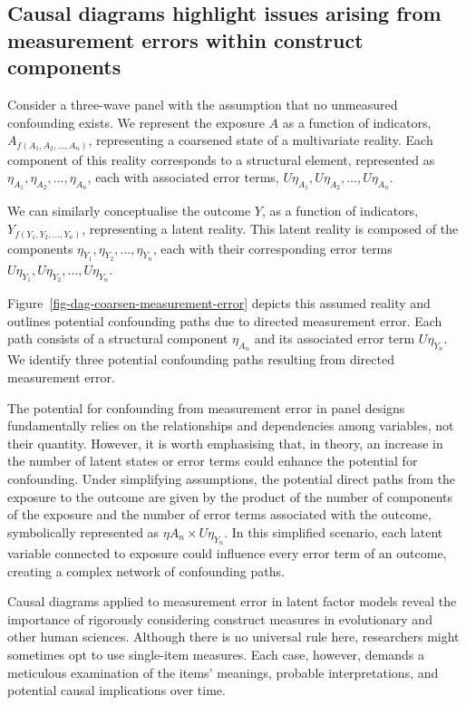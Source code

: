 \documentclass[
  singlecolumn]{report}
\begin{document}
\hypertarget{causal-diagrams-highlight-issues-arising-from-measurement-errors-within-construct-components}{%
\subsection{Causal diagrams highlight issues arising from measurement
errors within construct
components}\label{causal-diagrams-highlight-issues-arising-from-measurement-errors-within-construct-components}}

Consider a three-wave panel with the assumption that no unmeasured
confounding exists. We represent the exposure \(A\) as a function of
indicators, \(A_{f(A_1, A_2, ..., A_n)}\), representing a coarsened
state of a multivariate reality. Each component of this reality
corresponds to a structural element, represented as
\(\eta_{A_1}, \eta_{A_2}, ..., \eta_{A_n}\), each with associated error
terms, \(U\eta_{A_1}, U\eta_{A_2}, ..., U\eta_{A_n}\).

We can similarly conceptualise the outcome \(Y\), as a function of
indicators, \(Y_{f(Y_1, Y_2, ..., Y_n)}\), representing a latent
reality. This latent reality is composed of the components
\(\eta_{Y_1}, \eta_{Y_2}, ..., \eta_{Y_n}\), each with their
corresponding error terms
\(U\eta_{Y_1}, U\eta_{Y_2}, ..., U\eta_{Y_n}\).

Figure~\ref{fig-dag-coarsen-measurement-error} depicts this assumed
reality and outlines potential confounding paths due to directed
measurement error. Each path consists of a structural component
\(\eta_{A_n}\) and its associated error term \(U\eta_{Y_n}\). We
identify three potential confounding paths resulting from directed
measurement error.

The potential for confounding from measurement error in panel designs
fundamentally relies on the relationships and dependencies among
variables, not their quantity. However, it is worth emphasising that, in
theory, an increase in the number of latent states or error terms could
enhance the potential for confounding. Under simplifying assumptions,
the potential direct paths from the exposure to the outcome are given by
the product of the number of components of the exposure and the number
of error terms associated with the outcome, symbolically represented as
\(\eta A_n \times U\eta_{Y_n}\). In this simplified scenario, each
latent variable connected to exposure could influence every error term
of an outcome, creating a complex network of confounding paths.

Causal diagrams applied to measurement error in latent factor models
reveal the importance of rigorously considering construct measures in
evolutionary and other human sciences. Although there is no universal
rule here, researchers might sometimes opt to use single-item measures.
Each case, however, demands a meticulous examination of the items'
meanings, probable interpretations, and potential causal implications
over time.
\end{document}
